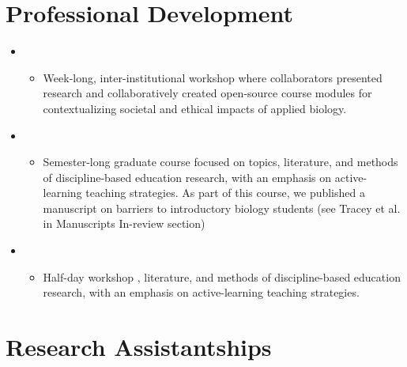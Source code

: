 \documentclass[11pt,a4paper,sans]{moderncv}        %
\begin{document}
\section{Professional Development}
\begin{itemize}
\item{}
\begin{itemize}
\item{\footnotesize{Week-long, inter-institutional workshop where collaborators presented research and collaboratively created open-source course modules for contextualizing societal and ethical impacts of applied biology.}}
\end{itemize}
\item{}
\begin{itemize}
\item{\footnotesize{Semester-long graduate course focused on topics, literature, and methods of discipline-based education research, with an emphasis on active-learning teaching strategies. As part of this course, we published a manuscript on barriers to introductory biology students (see Tracey et al. in Manuscripts In-review section)}}
\end{itemize}
\item{}
\begin{itemize}
\item{\footnotesize{Half-day workshop , literature, and methods of discipline-based education research, with an emphasis on active-learning teaching strategies.}}
\end{itemize}
\end{itemize}


\section{Research Assistantships}
\end{document}
